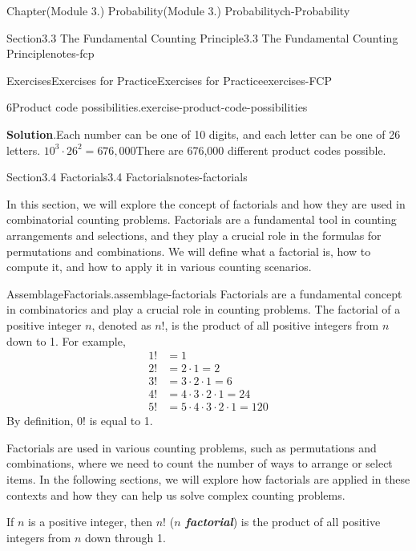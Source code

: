 \documentclass[oneside,10pt,]{book}
\newcommand{\blocktitlefont}{\relax}
\newcommand{\alert}[1]{\textbf{\textit{#1}}}
\newcommand{\amp}{&}
\begin{document}
\begin{chapterptx}{Chapter}{(Module 3.) Probability}{}{(Module 3.) Probability}{}{}{ch-Probability}
\begin{sectionptx}{Section}{3.3 The Fundamental Counting Principle}{}{3.3 The Fundamental Counting Principle}{}{}{notes-fcp}
\begin{exercises-subsection-numberless}{Exercises}{Exercises for Practice}{}{Exercises for Practice}{}{}{exercises-FCP}
\begin{divisionexercise}{6}{Product code possibilities.}{}{exercise-product-code-possibilities}
\par\smallskip%
\noindent\textbf{\blocktitlefont Solution}.\hypertarget{exercise-product-code-possibilities-3}{}\quad{}Each number can be one of 10 digits, and each letter can be one of 26 letters.%
\(10^3 \cdot 26^2 = 676,000\)There are 676,000 different product codes possible.%
\end{divisionexercise}%
\end{exercises-subsection-numberless}
\end{sectionptx}
%
%
\typeout{************************************************}
\typeout{************************************************}
%
\begin{sectionptx}{Section}{3.4 Factorials}{}{3.4 Factorials}{}{}{notes-factorials}
\begin{introduction}{}%
In this section, we will explore the concept of factorials and how they are used in combinatorial counting problems. Factorials are a fundamental tool in counting arrangements and selections, and they play a crucial role in the formulas for permutations and combinations. We will define what a factorial is, how to compute it, and how to apply it in various counting scenarios.%
\end{introduction}%
\begin{assemblage}{Assemblage}{Factorials.}{assemblage-factorials}%
Factorials are a fundamental concept in combinatorics and play a crucial role in counting problems. The factorial of a positive integer \(n\), denoted as \(n!\), is the product of all positive integers from \(n\) down to 1. For example, %
\begin{align*}
1! \amp = 1\\
2! \amp = 2 \cdot 1 = 2\\
3! \amp = 3 \cdot 2 \cdot 1 = 6\\
4! \amp = 4 \cdot 3 \cdot 2 \cdot 1 = 24\\
5! \amp = 5 \cdot 4 \cdot 3 \cdot 2 \cdot 1 = 120
\end{align*}
%
 By definition, \(0!\) is equal to 1.%
\par
Factorials are used in various counting problems, such as permutations and combinations, where we need to count the number of ways to arrange or select items. In the following sections, we will explore how factorials are applied in these contexts and how they can help us solve complex counting problems.%
\par
If \(n\) is a positive integer, then \(n!\) (\alert{\(n\) factorial}) is the product of all positive integers from \(n\) down through 1.%

\end{assemblage}
\end{sectionptx}
\end{chapterptx}
\end{document}
